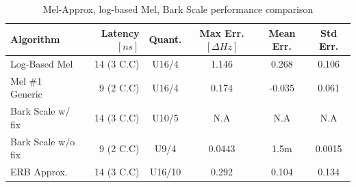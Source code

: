     
    



\begin{table}[H]
    \hspace*{-1.8cm}
\begin{tabular}{ !{\color{mtblborder}\vrule}l!{\color{mtblborder}\vrule}rcccc| } 
    \hline

    \hline
     \color{white}\bf{Algorithm} 
    & \color{white}\bf{Latency \([ns]\)}  
    & \color{white}\bf{Quant.} 
    & \color{white}\bf{Max Err. \([\Delta Hz]\)}
    & \color{white}\bf{Mean Err.}
    & \color{white}\bf{Std Err.} \\
    \hline

    \hline
     Log-Based Mel   & 14 (3 C.C) & U16/4 & 1.146 & 0.268 & 0.106 \\
    \hline
    
    \hline
     Mel \#1 Generic     & 9 (2 C.C) &  U16/4  & 0.174 & -0.035 & 0.061 \\
    \hline
    
    \hline
     Bark Scale w/ fix      & 14 (3 C.C) &  U10/5 & N.A & N.A & N.A \\
    \hline

    \hline
     Bark Scale w/o fix     & 9 (2 C.C) &  U9/4  & 0.0443 & 1.5m & 0.0015 \\
    \hline

    \hline
     ERB Approx.     & 14 (3 C.C) &  U16/10  & 0.292 & 0.104 & 0.134 \\
    \hline

    \hline
\end{tabular}
\caption{Mel-Approx, log-based Mel, Bark Scale performance comparison}
\label{tbl:scale_performance_tbl}
\end{table}


